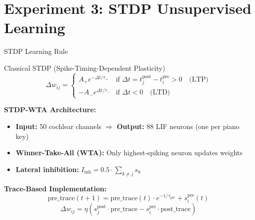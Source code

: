 \documentclass[aspectratio=169,20pt]{beamer}
\begin{document}
\section{Experiment 3: STDP Unsupervised Learning}
\begin{frame}{STDP Learning Rule}
	\begin{block}{Classical STDP (Spike-Timing-Dependent Plasticity)}
		\begin{equation}
			\Delta w_{ij} = \begin{cases}
				A_+ e^{-\Delta t/\tau_+} & \text{if } \Delta t = t_j^{\text{post}} - t_i^{\text{pre}} > 0 \quad \text{(LTP)}\\
				-A_- e^{\Delta t/\tau_-} & \text{if } \Delta t < 0 \quad \text{(LTD)}
			\end{cases}
		\end{equation}
	\end{block}
	
	\vspace{-0.3cm}
	\textbf{STDP-WTA Architecture:}
	\begin{itemize}
		\item \textbf{Input:} 50 cochlear channels $\Rightarrow$ \textbf{Output:} 88 LIF neurons (one per piano key) 
		\item \textbf{Winner-Take-All (WTA):} Only highest-spiking neuron updates weights
		\item \textbf{Lateral inhibition:} $I_{\text{inh}} = 0.5 \cdot \sum_{k \neq j} s_k$
	\end{itemize}
	
	\vspace{0.1cm}
	\textbf{Trace-Based Implementation:}
	\begin{equation}
		\text{pre\_trace}(t+1) = \text{pre\_trace}(t) \cdot e^{-1/\tau_{\text{pre}}} + s_i^{\text{pre}}(t)
	\end{equation}
	\begin{equation}
		\Delta w_{ij} = \eta \left( s_j^{\text{post}} \cdot \text{pre\_trace} - s_i^{\text{pre}} \cdot \text{post\_trace} \right)
	\end{equation}
\end{frame}
\end{document}
